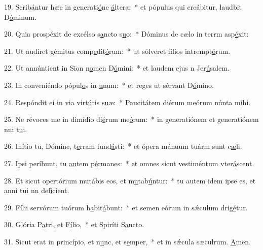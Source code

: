 19. Scribántur hæc in generati\uline{ó}ne \uline{á}ltera:~* et pópulus qui creábitur, laudbit D\uline{ó}minum.\par 
20. Quia prospéxit de excélso s\uline{a}ncto s\uline{u}o:~* Dóminus de cælo in terrm asp\uline{é}xit:\par 
21. Ut audíret gémitus comp\uline{e}dit\uline{ó}rum:~* ut sólveret fílios intrempt\uline{ó}rum.\par 
22. Ut annúntient in Sion n\uline{o}men D\uline{ó}mini:~* et laudem ejus n Jer\uline{ú}salem.\par 
23. In conveniéndo pópul\uline{o}s in \uline{u}num:~* et reges ut sérvant D\uline{ó}mino.\par 
24. Respóndit ei in via virt\uline{ú}tis s\uline{u}æ:~* Paucitátem diérum meórum núnta m\uline{i}hi.\par 
25. Ne révoces me in dimídio di\uline{é}rum me\uline{ó}rum:~* in generatiónem et generatiónem nni t\uline{u}i.\par 
26. Inítio tu, Dómine, t\uline{e}rram fund\uline{á}sti:~* et ópera mánuum tuárm sunt c\uline{æ}li.\par 
27. Ipsi períbunt, tu \uline{au}tem p\uline{é}rmanes:~* et omnes sicut vestiméntum vter\uline{á}scent.\par 
28. Et sicut opertórium mutábis eos, et m\uline{u}tab\uline{ú}ntur:~* tu autem idem ipse es, et anni tui nn def\uline{í}cient.\par 
29. Fílii servórum tuórum h\uline{a}bit\uline{á}bunt:~* et semen eórum in sǽculum drig\uline{é}tur.\par 
30. Glória P\uline{a}tri, et F\uline{í}lio,~* et Spiríti S\uline{a}ncto.\par 
31. Sicut erat in princípio, et n\uline{u}nc, et s\uline{e}mper,~* et in sǽcula sæculrum. \uline{A}men.\par 
